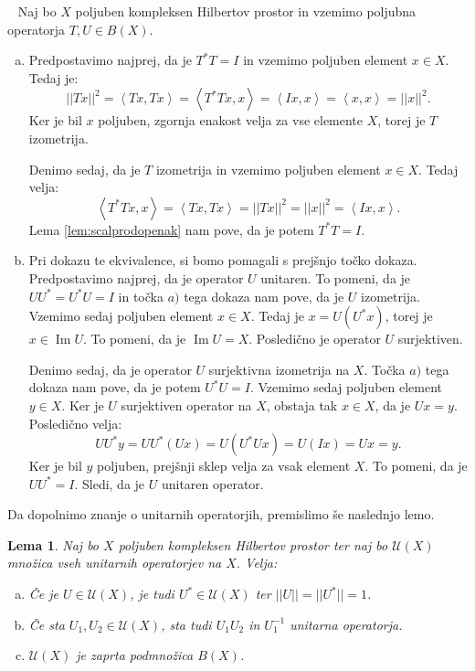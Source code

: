 \documentclass[12pt,a4paper,oneside,fleqn,openany]{book}
\newtheorem{lema}[izrek]{Lema}
\newcommand{\eopf}{\raisebox{0.8ex}{\framebox{}}} %
\newenvironment{dokaz}%
{\noindent{\bf Dokaz.}\ }%
{\hfill\eopf\par\bigskip}%
\newcommand{\abs}[1]{\ensuremath{\lvert #1 \rvert}}
\newcommand{\norm}[1]{\abs{\abs{#1}}}
\newcommand{\Sp}[2]{\ensuremath{\left<#1, #2\right>}}
\begin{document}
\begin{dokaz}
	Naj bo $X$ poljuben kompleksen Hilbertov prostor in vzemimo poljubna operatorja $T, U\in B(X)$.
	\begin{enumerate}[a)]
		\item Predpostavimo najprej, da je $T^*T = I$ in vzemimo poljuben element $x\in X$. Tedaj je: $$\norm{Tx}^2=\Sp{Tx}{Tx} = \Sp{T^*Tx}{x}= \Sp{Ix}{x} = \Sp{x}{x} = \norm{x}^2.$$
		Ker je bil $x$ poljuben, zgornja enakost velja za vse elemente $X$, torej je $T$ izometrija.
			
		Denimo sedaj, da je $T$ izometrija in vzemimo poljuben element $x\in X$. Tedaj velja: $$\Sp{T^*Tx}{x} = \Sp{Tx}{Tx} = \norm{Tx}^2 = \norm{x}^2 = \Sp{Ix}{x}.$$
		Lema \ref{lem:scalprodopenak} nam pove, da je potem $T^*T = I$.
			
		\item Pri dokazu te ekvivalence, si bomo pomagali s prejšnjo točko dokaza.
		Predpostavimo najprej, da je operator $U$ unitaren. To pomeni, da je $UU^*=U^*U = I$ in točka $a)$ tega dokaza nam pove, da je $U$ izometrija. Vzemimo sedaj poljuben element $x\in X$. Tedaj je $x = U(U^*x)$, torej je $x\in \operatorname{Im}U$. To pomeni, da je $\operatorname{Im}U = X$. Posledično je operator $U$ surjektiven.
			
		Denimo sedaj, da je operator $U$ surjektivna izometrija na $X$. Točka $a)$ tega dokaza nam pove, da je potem $U^*U = I$. Vzemimo sedaj poljuben element $y\in X$. Ker je $U$ surjektiven operator na $X$, obstaja tak $x\in X$, da je $Ux = y$. Posledično velja: $$UU^*y = UU^*(Ux) = U(U^*Ux) = U(Ix) = Ux = y.$$
		Ker je bil $y$ poljuben, prejšnji sklep velja za vsak element $X$. To pomeni, da je $UU^* = I$. Sledi, da je $U$ unitaren operator.
	\end{enumerate}
\end{dokaz}

Da dopolnimo znanje o unitarnih operatorjih, premislimo še naslednjo lemo.

\begin{lema}
	\label{lem:unitarset}
	Naj bo $X$ poljuben kompleksen Hilbertov prostor ter naj bo $\mathcal{U}(X)$ množica vseh unitarnih operatorjev na $X$. Velja:
	\begin{enumerate}[a)]
		\item Če je $U\in \mathcal{U}(X)$, je tudi $U^*\in \mathcal{U}(X)$ ter $\norm{U} = \norm{U^*} = 1$.
		\item Če sta $U_1, U_2 \in \mathcal{U}(X)$, sta tudi $U_1U_2$ in $U_1^{-1}$ unitarna operatorja.
		\item $\mathcal{U}(X)$ je zaprta podmnožica $B(X)$.
	\end{enumerate}
\end{lema}
\end{document}
